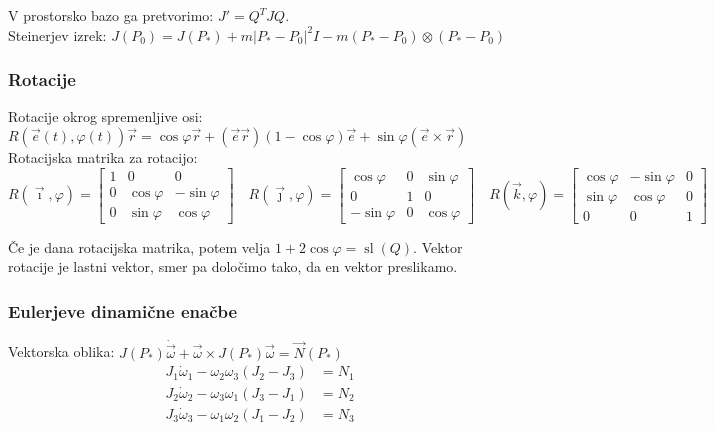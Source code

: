 \documentclass[a4paper,10pt]{article}
\theoremstyle{definition}
\newcommand{\vomega}{\vec{\omega}}
\newcommand{\domega}{\dot{\vomega}}
\newcommand{\Pt}{P_{\ast}}
\begin{document}
V prostorsko bazo ga pretvorimo: $J' = Q^TJQ$. \\
Steinerjev izrek: $J(P_0) = J(\Pt) + m|\Pt - P_0|^2I - m(\Pt - P_0) \otimes (\Pt
- P_0)$

\subsubsection*{Rotacije}
Rotacije okrog spremenljive osi:
$R(\vec{e}(t),\varphi(t))\vec{r} = \cos\varphi\vec{r} +
(\vec{e}\vec{r})(1-\cos\varphi)\vec{e} + \sin\varphi(\vec{e} \times \vec{r})$ \\
Rotacijska matrika za rotacijo: \\
\[
  R(\vec{\imath}, \varphi) =
  \begin{bmatrix}
    1 & 0 & 0 \\
    0 & \cos\varphi & -\sin\varphi \\
    0 & \sin\varphi & \cos\varphi
  \end{bmatrix} \quad
  R(\vec{\jmath}, \varphi) =
  \begin{bmatrix}
    \cos\varphi & 0 & \sin\varphi  \\
    0           & 1 & 0   \\
    -\sin\varphi & 0 & \cos\varphi
  \end{bmatrix} \quad
  R(\vec{k}, \varphi) =
  \begin{bmatrix}
    \cos\varphi & -\sin\varphi & 0 \\
    \sin\varphi & \cos\varphi & 0 \\
    0 & 0 & 1
  \end{bmatrix}
\]

Če je dana rotacijska matrika, potem velja $1 + 2\cos\varphi =
\operatorname{sl}(Q)$. Vektor rotacije je lastni vektor, smer pa določimo tako,
da en vektor preslikamo.

\subsubsection*{Eulerjeve dinamične enačbe}
Vektorska oblika: $J(\Pt)\domega + \vomega \times J(\Pt)\vomega =
\vec{N}(\Pt)$
\begin{align*}
  J_1\dot{\omega}_1 - \omega_2\omega_3(J_2 - J_3) &= N_1 \\
  J_2\dot{\omega}_2 - \omega_3\omega_1(J_3 - J_1) &= N_2 \\
  J_3\dot{\omega}_3 - \omega_1\omega_2(J_1 - J_2) &= N_3
\end{align*}
\end{document}
